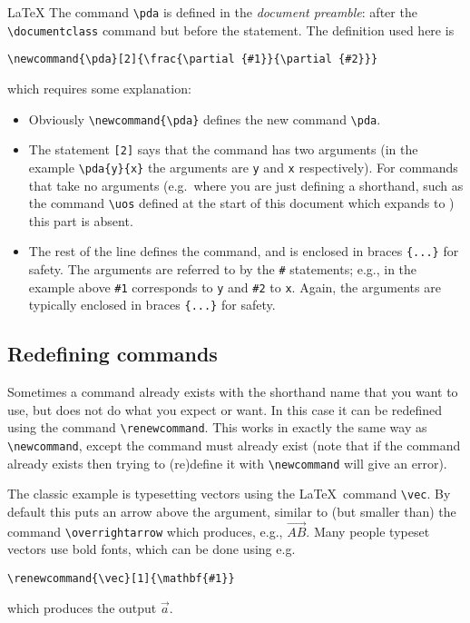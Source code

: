 \begin{chapter}{\LaTeX}
The command \verb|\pda| is defined in the \emph{document preamble}: after the \verb|\documentclass| command but before the \verb|| statement. The definition used here is
%
\begin{center}
  \verb|\newcommand{\pda}[2]{\frac{\partial {#1}}{\partial {#2}}}|
\end{center}
%
which requires some explanation:
\begin{itemize}
\item Obviously \verb|\newcommand{\pda}| defines the new command
  \verb|\pda|.
\item The statement \verb|[2]| says that the command has two arguments
  (in the example \verb|\pda{y}{x}| the arguments are \verb|y| and
  \verb|x| respectively). For commands that take no arguments (e.g.\
  where you are just defining a shorthand, such as the command
  \verb|\uos| defined at the start of this document which expands to
  \uos) this part is absent.
\item The rest of the line defines the command, and is enclosed in
  braces \verb|{...}| for safety. The arguments are referred to by the
  \verb|#| statements; e.g., in the example above \verb|#1|
  corresponds to \verb|y| and \verb|#2| to \verb|x|. Again, the
  arguments are typically enclosed in braces \verb|{...}| for safety.
\end{itemize}

\subsection{Redefining commands}
\label{sec:commands_redefn}

Sometimes a command already exists with the shorthand name that you want to use, but does not do what you expect or want. In this case it can be redefined using the command \verb|\renewcommand|. This works in exactly the same way as \verb|\newcommand|, except the command must already exist (note that if the command already exists then trying to (re)define it with \verb|\newcommand| will give an error).

The classic example is typesetting vectors using the \LaTeX\ command \verb|\vec|. By default this puts an arrow above the argument, similar to (but smaller than) the command \verb|\overrightarrow| which produces, e.g., $\overrightarrow{AB}$. Many people typeset vectors use bold fonts, which can be done using e.g.\
%
\begin{center}
  \verb|\renewcommand{\vec}[1]{\mathbf{#1}}|
\end{center}
%
which produces the output $\vec{a}$.


\end{chapter}

